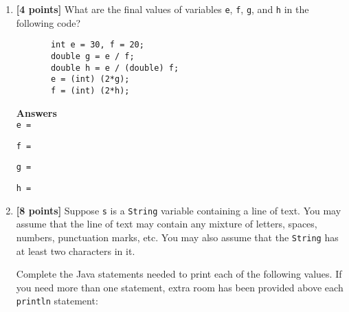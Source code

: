 \documentclass[11pt]{report}
\begin{document}
\begin{enumerate}




















\newpage

\item {\bf [4 points]}
What are the final values of variables {\tt e}, {\tt f}, {\tt g}, and
{\tt h} in the following code?
\begin{verbatim}
       int e = 30, f = 20;
       double g = e / f;
       double h = e / (double) f;
       e = (int) (2*g);
       f = (int) (2*h);
\end{verbatim}
{\bf Answers}\\
\verb$e = $\underline{\hspace{.5in}}

\bigskip
\verb$f = $\underline{\hspace{.5in}}

\bigskip
\verb$g = $\underline{\hspace{.5in}}

\bigskip
\verb$h = $\underline{\hspace{.5in}}

\bigskip \item {\bf [8 points]} Suppose {\tt s} is a {\tt String} variable containing a line of text.  You may assume
that the line of text may contain any mixture of letters, spaces, numbers, punctuation marks, etc. You may also assume
that the {\tt String} has at least two characters in it.

Complete the Java statements needed to print each of the following values. If you need more than one statement, extra
room has been provided above each {\tt println} statement:


\end{enumerate}
\end{document}

